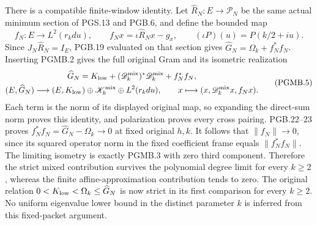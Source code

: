 There is a compatible finite-window identity. Let
$\widehat R_N:E\to\mathcal P_N$ be the same actual minimum
section of PGS.13 and PGB.6, and define the bounded map
\[
 f_N:E\longrightarrow L^2(r_kdu),\qquad
 f_Nx=\iota\widehat R_Nx-g_x,\qquad
 (\iota P)(u)=P(k/2+iu).
 \tag{PGMB.4}\label{eq:pgmb-finite-tail}
\]
Since $J_N\widehat R_N=I_E$, PGB.19 evaluated on that section
gives $\widehat G_N=\Omega_k+f_N^*f_N$. Inserting PGMB.2
gives the full original Gram and its isometric realization
\[
 \begin{gathered}
 \widehat G_N=K_{\rm low}
       +(\mathscr D_k^{\rm mix})^*\mathscr D_k^{\rm mix}+f_N^*f_N,\\
 (E,\widehat G_N)\longrightarrow
 (E,K_{\rm low})\oplus\mathscr K_k^{\rm mix}\oplus L^2(r_kdu),
 \qquad x\longmapsto(x,\mathscr D_k^{\rm mix}x,f_Nx).
 \end{gathered}
 \tag{PGMB.5}\label{eq:pgmb-three-term-isometry}
\]
Each term is the norm of its displayed original map, so expanding
the direct-sum norm proves this identity, and polarization
proves every cross pairing. PGB.22--23 proves
$f_N^*f_N=\widehat G_N-\Omega_k\to0$ at fixed original $h,k$.
It follows that $\|f_N\|\to0$, since its squared operator norm
in the fixed coefficient frame equals $\|f_N^*f_N\|$.
The limiting isometry is exactly PGMB.3 with zero third
component. Therefore the strict mixed contribution survives
the polynomial degree limit for every $k\geq2$, whereas the
finite affine-approximation contribution tends to zero.
The original relation $0<K_{\rm low}<\Omega_k\leq\widehat G_N$
is now strict in its first comparison for every $k\geq2$.
No uniform eigenvalue lower bound in the distinct parameter
$k$ is inferred from this fixed-packet argument.

